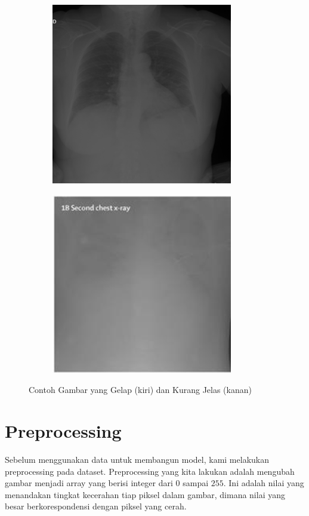 \begin{figure}
\centering
\begin{subfigure}{.5\textwidth}
  \centering
  \includegraphics[width=.6\linewidth]{pics/COVID-1783.png}
\end{subfigure}%
\begin{subfigure}{.5\textwidth}
  \centering
  \includegraphics[width=.6\linewidth]{pics/COVID-698.png}
\end{subfigure}
\caption{Contoh Gambar yang Gelap (kiri) dan Kurang Jelas (kanan)}
\label{gelap terang}
\end{figure}

\section{Preprocessing}
Sebelum menggunakan data untuk membangun model, kami melakukan preprocessing pada dataset. Preprocessing yang kita lakukan adalah mengubah gambar menjadi array yang berisi integer dari $0$ sampai $255$. Ini adalah nilai yang menandakan tingkat kecerahan tiap piksel dalam gambar, dimana nilai yang besar berkorespondensi dengan piksel yang cerah.

